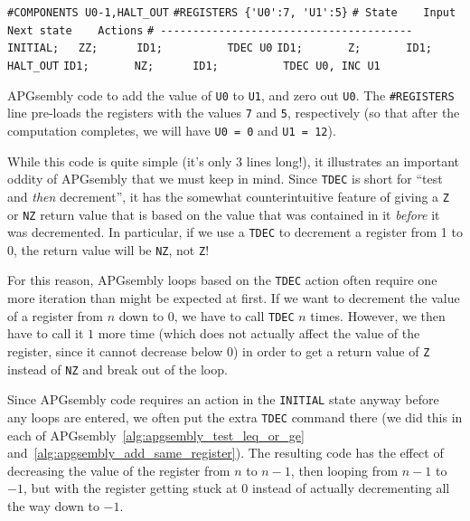 \begin{apgsembly}
	\begin{algorithmic}\small
		\State \verb|#COMPONENTS U0-1,HALT_OUT|
		\State \verb|#REGISTERS {'U0':7, 'U1':5}|
		\State \verb|# State    Input    Next state    Actions|
		\State \verb|# ---------------------------------------|
		\State \verb|INITIAL;   ZZ;      ID1;          TDEC U0|
		\State \verb|ID1;       Z;       ID1;          HALT_OUT|
		\State \verb|ID1;       NZ;      ID1;          TDEC U0, INC U1|
	\end{algorithmic}
	\caption{APGsembly code to add the value of \texttt{U0} to \texttt{U1}, and zero out \texttt{U0}. The \texttt{\#REGISTERS} line pre-loads the registers with the values \texttt{7} and \texttt{5}, respectively (so that after the computation completes, we will have \texttt{U0 = 0} and \texttt{U1 = 12}).}\label{alg:apgsembly_add_same_register}
\end{apgsembly}

While this code is quite simple (it's only $3$ lines long!), it illustrates an important oddity of APGsembly that we must keep in mind. Since \texttt{TDEC} is short for ``test and \emph{then} decrement'', it has the somewhat counterintuitive feature of giving a \texttt{Z} or \texttt{NZ} return value that is based on the value that was contained in it \emph{before} it was decremented. In particular, if we use a \texttt{TDEC} to decrement a register from 1 to 0, the return value will be \texttt{NZ}, not \texttt{Z}!

For this reason, APGsembly loops based on the \texttt{TDEC} action often require one more iteration than might be expected at first. If we want to decrement the value of a register from $n$ down to $0$, we have to call \texttt{TDEC} $n$ times. However, we then have to call it $1$ more time (which does not actually affect the value of the register, since it cannot decrease below $0$) in order to get a return value of \texttt{Z} instead of \texttt{NZ} and break out of the loop.

Since APGsembly code requires an action in the \texttt{INITIAL} state anyway before any loops are entered, we often put the extra \texttt{TDEC} command there (we did this in each of APGsembly~\ref{alg:apgsembly_test_leq_or_ge} and~\ref{alg:apgsembly_add_same_register}). The resulting code has the effect of decreasing the value of the register from $n$ to $n-1$, then looping from $n-1$ to $-1$, but with the register getting stuck at $0$ instead of actually decrementing all the way down to $-1$.

